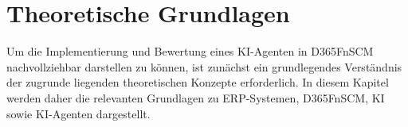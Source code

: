 \section{Theoretische Grundlagen}
Um die Implementierung und Bewertung eines \ac{KI}-Agenten in \ac{D365FnSCM} nachvollziehbar darstellen zu können, ist zunächst ein grundlegendes Verständnis der zugrunde liegenden theoretischen Konzepte erforderlich. In diesem Kapitel werden daher die relevanten Grundlagen zu \ac{ERP}-Systemen, \ac{D365FnSCM}, \ac{KI} sowie \ac{KI}-Agenten dargestellt.



